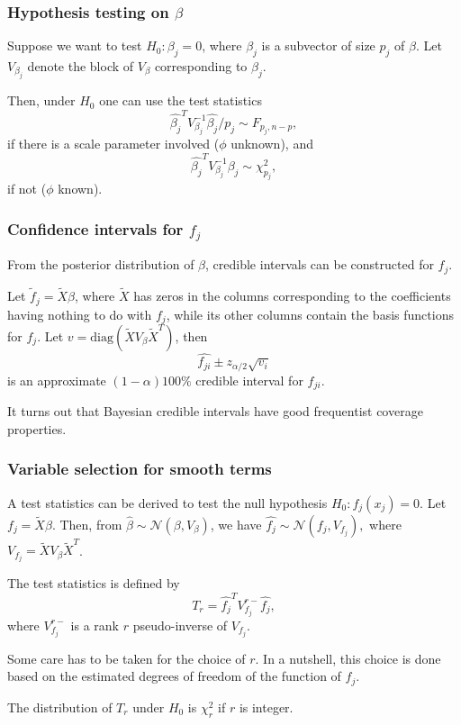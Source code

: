 \documentclass{beamer}
\newcommand{\bs}{\bigskip}
\begin{document}
\begin{frame}
\frametitle{Hypothesis testing on $\beta$}
Suppose we want to test $H_0: \beta_j=0$, where $\beta_j$ is a subvector of size
$p_j$ of 
$\beta$. Let $V_{\beta_j}$ denote the block of $V_{\beta}$ corresponding to
$\beta_j$. 

\bs
Then, under $H_0$  one can use the test statistics
$$\hat{\beta_j}^T V_{\beta_j}^{-1} \hat{\beta_j}/p_j \sim F_{p_j,n-p},$$
if there is a scale parameter involved ($\phi$ unknown), and 
$$\hat{\beta_j}^T V_{\beta_j}^{-1} \hat{\beta_j} \sim \chi_{p_j}^2,$$
if not  ($\phi$ known).
\end{frame}

\begin{frame}
\frametitle{Confidence intervals for $f_j$}

From the posterior distribution of $\beta$, credible intervals can be constructed for $f_j$. 

\bs
Let $\tilde{f}_j = \tilde{X} \beta$, where $\tilde{X}$ has zeros in the columns corresponding to the coefficients having nothing to do with $f_j$, while its other columns contain the basis functions for $f_j$. Let $v= \mbox{diag}(\tilde{X} V_{\beta} \tilde{X}^T)$, then
$$\hat{f_{ji}} \pm z_{\alpha/2} \sqrt{v_i}$$
is an approximate $(1-\alpha) 100 \%$  credible interval for $f_{ji}$.

\bs
It turns out that Bayesian credible intervals have good frequentist coverage properties.

\end{frame}


\begin{frame}
\frametitle{Variable selection for smooth terms}
A test statistics can be derived to test the null hypothesis $H_0:
f_j(x_j)=0$. Let $f_j = \tilde{X} \beta$. Then, from $\hat{\beta} \sim {\mathcal
N}(\beta, V_{\beta})$, we have $ \hat{f_j} \sim {\mathcal N}(f_j,  V_{f_j}),$
where $V_{f_j} = \tilde{X}  V_{\beta} \tilde{X}^T$.

\bs
The test statistics is defined by
$$ T_r = \hat{f_j}^T V_{f_j}^{r -} \hat{f_j} ,$$
where $V_{f_j}^{r -}$ is a rank $r$ pseudo-inverse of $V_{f_j}$.

\bs
Some care has to be taken for the choice of $r$. In a nutshell, this choice is done based on the estimated degrees of freedom of the function of $f_j$.

\bs
The distribution of $T_r$ under $H_0$ is $\chi^2_r$ if $r$ is integer.
\end{frame}
\end{document}
